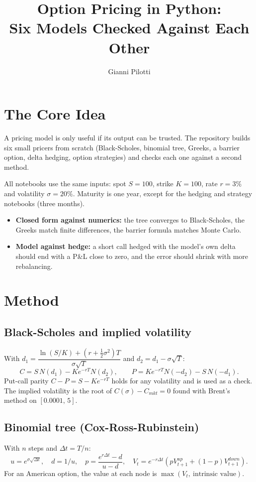 \documentclass[11pt,a4paper]{article}
\title{Option Pricing in Python:\\Six Models Checked Against Each Other}
\author{Gianni Pilotti}
\date{}
\begin{document}
\maketitle

\section{The Core Idea}
A pricing model is only useful if its output can be trusted. The repository builds six small pricers from scratch (Black-Scholes, binomial tree, Greeks, a barrier option, delta hedging, option strategies) and checks each one against a second method.

All notebooks use the same inputs: spot $S=100$, strike $K=100$, rate $r=3\%$ and volatility $\sigma=20\%$. Maturity is one year, except for the hedging and strategy notebooks (three months).

\begin{itemize}
\item \textbf{Closed form against numerics:} the tree converges to Black-Scholes, the Greeks match finite differences, the barrier formula matches Monte Carlo.
\item \textbf{Model against hedge:} a short call hedged with the model's own delta should end with a P\&L close to zero, and the error should shrink with more rebalancing.
\end{itemize}

\section{Method}
\subsection{Black-Scholes and implied volatility}
With $d_1=\dfrac{\ln(S/K)+(r+\tfrac12\sigma^2)T}{\sigma\sqrt T}$ and $d_2=d_1-\sigma\sqrt T$:
\[
C=S\,N(d_1)-Ke^{-rT}N(d_2),\qquad
P=Ke^{-rT}N(-d_2)-S\,N(-d_1).
\]
Put-call parity $C-P=S-Ke^{-rT}$ holds for any volatility and is used as a check. The implied volatility is the root of $C(\sigma)-C_{mkt}=0$ found with Brent's method on $[0.0001,\,5]$.

\subsection{Binomial tree (Cox-Ross-Rubinstein)}
With $n$ steps and $\Delta t=T/n$:
\[
u=e^{\sigma\sqrt{\Delta t}},\quad d=1/u,\quad p=\frac{e^{r\Delta t}-d}{u-d},\quad
V_t=e^{-r\Delta t}\left(pV_{t+1}^{up}+(1-p)V_{t+1}^{down}\right).
\]
For an American option, the value at each node is $\max(V_t,\ \text{intrinsic value})$.
\end{document}
